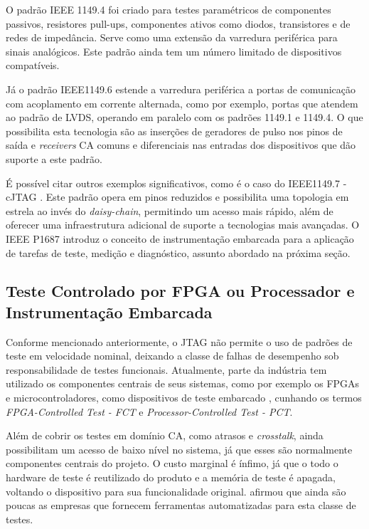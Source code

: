 O padrão IEEE 1149.4 \citep{ieee11494} foi criado para testes paramétricos de componentes passivos, resistores pull-ups, componentes ativos como diodos, transistores e de redes de impedância. Serve como uma extensão da varredura periférica para sinais analógicos. Este padrão ainda tem um número limitado de dispositivos compatíveis.

Já o padrão IEEE1149.6 \citep{ieee11496} estende a varredura periférica a portas de comunicação com acoplamento em corrente alternada, como por exemplo, portas que atendem ao padrão de LVDS, operando em paralelo com os padrões 1149.1 e 1149.4. O que possibilita esta tecnologia são as inserções de geradores de pulso nos pinos de saída e \textit{receivers} CA comuns e diferenciais nas entradas dos dispositivos que dão suporte a este padrão.

É possível citar outros exemplos significativos, como é o caso do IEEE1149.7 - cJTAG \citep{ieee11497}. Este padrão opera em pinos reduzidos e possibilita uma topologia em estrela ao invés do \textit{daisy-chain}, permitindo um acesso mais rápido, além de oferecer uma infraestrutura adicional de suporte a tecnologias mais avançadas. O IEEE P1687 \citep{ieee1687} introduz o conceito de instrumentação embarcada para a aplicação de tarefas de teste, medição e diagnóstico, assunto abordado na próxima seção.

\subsection{Teste Controlado por FPGA ou Processador e Instrumentação Embarcada}
\label{FCT}

Conforme mencionado anteriormente, o JTAG não permite o uso de padrões de teste em velocidade nominal, deixando a classe de falhas de desempenho sob responsabilidade de testes funcionais. Atualmente, parte da indústria tem utilizado os componentes centrais de seus sistemas, como por exemplo os FPGAs e microcontroladores, como dispositivos de teste embarcado \citep{alcrouch2011, thomaswenzel2013}, cunhando os termos \textit{FPGA-Controlled Test - FCT} e \textit{Processor-Controlled Test - PCT}. 

 Além de cobrir os testes em domínio CA, como atrasos e \textit{crosstalk}, ainda possibilitam um acesso de baixo nível no sistema, já que esses são normalmente componentes centrais do projeto. O custo marginal é ínfimo, já que o todo o hardware de teste é reutilizado do produto e a memória de teste é apagada, voltando o dispositivo para sua funcionalidade original. \citet{jutman2014high} afirmou que ainda são poucas as empresas que fornecem ferramentas automatizadas para esta classe de testes.

